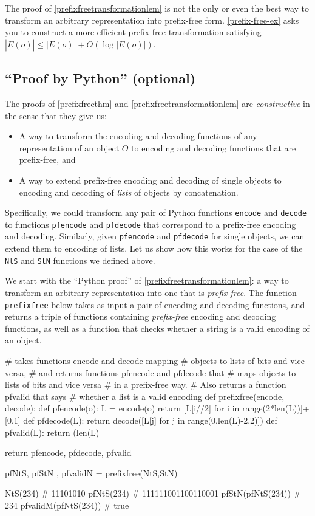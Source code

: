 The proof of \cref{prefixfreetransformationlem} is not the only or even
the best way to transform an arbitrary representation into prefix-free
form. \cref{prefix-free-ex} asks you to construct a more efficient
prefix-free transformation satisfying
\(|\overline{E}(o)| \leq |E(o)| + O(\log |E(o)|)\).

\subsection{``Proof by Python''
(optional)}\label{Proof-by-Python-optional}

The proofs of \cref{prefixfreethm} and
\cref{prefixfreetransformationlem} are \emph{constructive} in the sense
that they give us:

\begin{itemize}
\item
  A way to transform the encoding and decoding functions of any
  representation of an object \(O\) to encoding and decoding functions
  that are prefix-free, and
\item
  A way to extend prefix-free encoding and decoding of single objects to
  encoding and decoding of \emph{lists} of objects by concatenation.
\end{itemize}

Specifically, we could transform any pair of Python functions
\texttt{encode} and \texttt{decode} to functions \texttt{pfencode} and
\texttt{pfdecode} that correspond to a prefix-free encoding and
decoding. Similarly, given \texttt{pfencode} and \texttt{pfdecode} for
single objects, we can extend them to encoding of lists. Let us show how
this works for the case of the \texttt{NtS} and \texttt{StN} functions
we defined above.

We start with the ``Python proof'' of
\cref{prefixfreetransformationlem}: a way to transform an arbitrary
representation into one that is \emph{prefix free}. The function
\texttt{prefixfree} below takes as input a pair of encoding and decoding
functions, and returns a triple of functions containing
\emph{prefix-free} encoding and decoding functions, as well as a
function that checks whether a string is a valid encoding of an object.

\begin{code}
# takes functions encode and decode mapping
# objects to lists of bits and vice versa,
# and returns functions pfencode and pfdecode that
# maps objects to lists of bits and vice versa
# in a prefix-free way.
# Also returns a function pfvalid that says
# whether a list is a valid encoding
def prefixfree(encode, decode):
    def pfencode(o):
        L = encode(o)
        return [L[i//2] for i in range(2*len(L))]+[0,1]
    def pfdecode(L):
        return decode([L[j] for j in range(0,len(L)-2,2)])
    def pfvalid(L):
        return (len(L) %

    return pfencode, pfdecode, pfvalid

pfNtS, pfStN , pfvalidN = prefixfree(NtS,StN)

NtS(234)
# 11101010
pfNtS(234)
# 111111001100110001
pfStN(pfNtS(234))
# 234
pfvalidM(pfNtS(234))
# true
\end{code}

